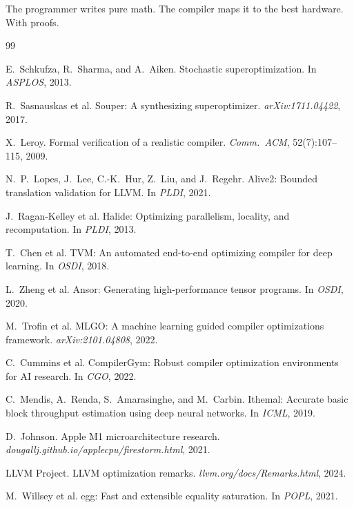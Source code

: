 \documentclass[11pt,twocolumn]{article}
\begin{document}
The programmer writes pure math. The compiler maps it to the best hardware. With proofs.

\begin{thebibliography}{99}
\small

E.~Schkufza, R.~Sharma, and A.~Aiken.
Stochastic superoptimization.
In \emph{ASPLOS}, 2013.

R.~Sasnauskas et al.
Souper: A synthesizing superoptimizer.
\emph{arXiv:1711.04422}, 2017.

X.~Leroy.
Formal verification of a realistic compiler.
\emph{Comm.\ ACM}, 52(7):107--115, 2009.

N.~P.~Lopes, J.~Lee, C.-K.~Hur, Z.~Liu, and J.~Regehr.
Alive2: Bounded translation validation for LLVM.
In \emph{PLDI}, 2021.

J.~Ragan-Kelley et al.
Halide: Optimizing parallelism, locality, and recomputation.
In \emph{PLDI}, 2013.

T.~Chen et al.
TVM: An automated end-to-end optimizing compiler for deep learning.
In \emph{OSDI}, 2018.

L.~Zheng et al.
Ansor: Generating high-performance tensor programs.
In \emph{OSDI}, 2020.

M.~Trofin et al.
MLGO: A machine learning guided compiler optimizations framework.
\emph{arXiv:2101.04808}, 2022.

C.~Cummins et al.
CompilerGym: Robust compiler optimization environments for AI research.
In \emph{CGO}, 2022.

C.~Mendis, A.~Renda, S.~Amarasinghe, and M.~Carbin.
Ithemal: Accurate basic block throughput estimation using deep neural networks.
In \emph{ICML}, 2019.

D.~Johnson.
Apple M1 microarchitecture research.
\emph{dougallj.github.io/applecpu/firestorm.html}, 2021.

LLVM Project.
LLVM optimization remarks.
\emph{llvm.org/docs/Remarks.html}, 2024.

M.~Willsey et al.
egg: Fast and extensible equality saturation.
In \emph{POPL}, 2021.

\end{thebibliography}
\end{document}
